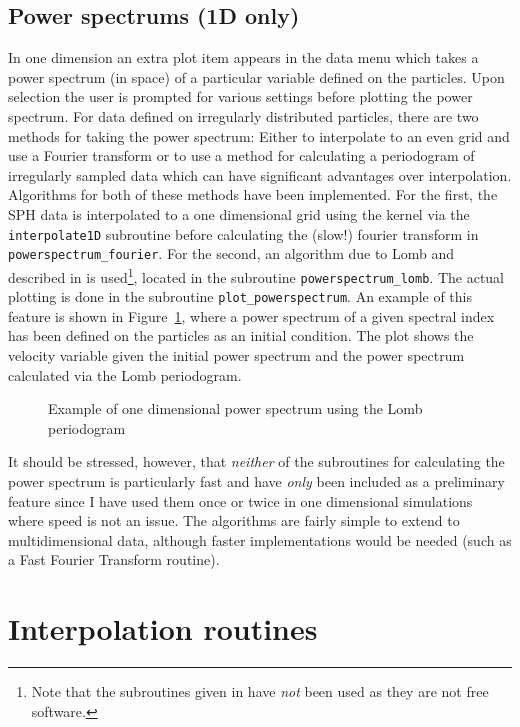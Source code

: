 \documentclass[a4paper,12pt]{article}
\begin{document}
\subsection{Power spectrums (1D only)}
 In one dimension an extra plot item appears
in the data menu which takes a power spectrum (in space) of a particular
variable defined on the particles. Upon selection the user is prompted for
various settings before plotting the power spectrum. For data defined on
irregularly distributed particles, there are two methods for taking the power
spectrum: Either to interpolate to an even grid and use a Fourier
transform or to use a method for calculating a periodogram of
irregularly sampled data which can have significant advantages over
interpolation. Algorithms for both of these methods have been
implemented. For the first, the SPH data is interpolated to a one dimensional
grid using the kernel via the \verb+interpolate1D+ subroutine before calculating the (slow!) fourier
transform in \verb+powerspectrum_fourier+. For the second, an algorithm due to
Lomb and \citet{scargle81} described in \citet{numericalrecipes} is
used\footnote{Note that the subroutines given in \citet{numericalrecipes} have
\emph{not} been used as they are not free software.},
located in the subroutine \verb+powerspectrum_lomb+. The actual plotting is done
in the subroutine \verb+plot_powerspectrum+. An example of this feature is shown
in Figure~\ref{fig:powerspectrum_lomb}, where a power spectrum of a given
spectral index has been defined on the particles as an initial condition. The
plot shows the velocity variable given the initial power spectrum and the power
spectrum calculated via the Lomb periodogram.
\begin{figure}
\centering

\caption{Example of one dimensional power spectrum using the Lomb periodogram}
\label{fig:powerspectrum_lomb}
\end{figure}

 It should be stressed, however, that \emph{neither} of the subroutines for
calculating the power spectrum is particularly fast and have \emph{only} been included as a preliminary feature
since I have used them once or twice in one dimensional simulations where speed
is not an issue. The algorithms are fairly simple to extend to multidimensional
data, although faster implementations would be needed (such as a Fast
Fourier Transform routine).


\section{Interpolation routines}
\end{document}
